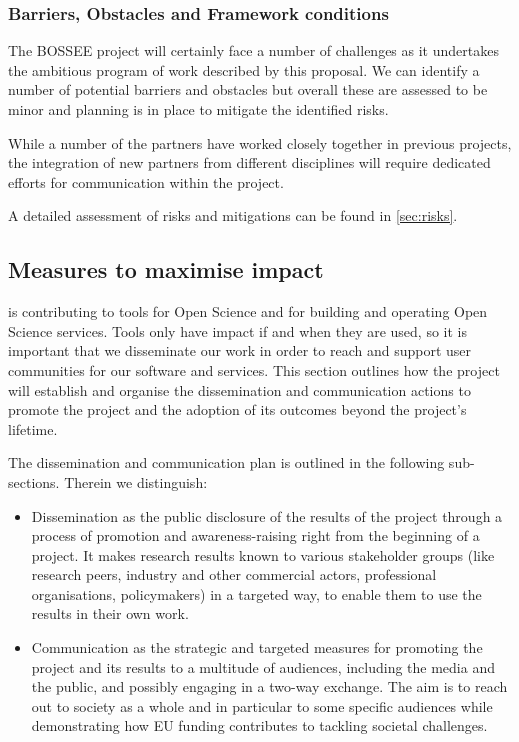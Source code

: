 \subsubsection{Barriers, Obstacles and Framework conditions}

The BOSSEE project will certainly face a number of challenges as it undertakes
the ambitious program of work described by this proposal.
We can identify a number of potential barriers and obstacles but overall
these are assessed to be minor and planning is in place to mitigate the
identified risks.

While a number of the partners have worked closely together in previous projects,
the integration of new partners from different disciplines will require
dedicated efforts for communication within the project.

A detailed assessment of risks and mitigations can be found in \ref{sec:risks}.

\subsection{Measures to maximise impact}

\TheProject is contributing to tools for Open Science and for building and operating Open Science services.
Tools only have impact if and when they are used,
so it is important that we disseminate our work
in order to reach and support user communities for our software and services. This section 
outlines how the project will establish and organise the dissemination and communication 
actions to promote the project and the adoption of its outcomes beyond the project's lifetime.

The dissemination and communication plan is outlined in the following sub-sections. 
Therein we distinguish:
\begin{itemize}
\item Dissemination as the public disclosure of the results of the project through 
a process of promotion and awareness-raising right from the beginning of a project. 
It makes research results known to various stakeholder groups (like research peers, industry 
and other commercial actors, professional organisations, policymakers) in a targeted 
way, to enable them to use the results in their own work.
\item Communication as the strategic and targeted measures for promoting the project 
and its results to a multitude of audiences, including the media and the public, and possibly 
engaging in a two-way exchange. The aim is to reach out to society as a whole and 
in particular to some specific audiences while demonstrating how EU funding contributes to tackling 
societal challenges.
\end{itemize} 

